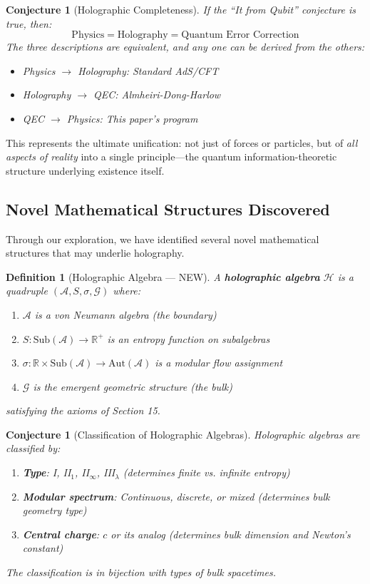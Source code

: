 \documentclass[12pt,a4paper]{article}
\newtheorem{conjecture}[theorem]{Conjecture}
\newtheorem{definition}[theorem]{Definition}
\begin{document}
\begin{conjecture}[Holographic Completeness]
If the ``It from Qubit'' conjecture is true, then:
\begin{equation}
\text{Physics} = \text{Holography} = \text{Quantum Error Correction}
\end{equation}
The three descriptions are equivalent, and any one can be derived from the others:
\begin{itemize}
    \item Physics $\to$ Holography: Standard AdS/CFT
    \item Holography $\to$ QEC: Almheiri-Dong-Harlow
    \item QEC $\to$ Physics: This paper's program
\end{itemize}
\end{conjecture}

This represents the ultimate unification: not just of forces or particles, but of \textit{all aspects of reality} into a single principle---the quantum information-theoretic structure underlying existence itself.

\subsection{Novel Mathematical Structures Discovered}

Through our exploration, we have identified several novel mathematical structures that may underlie holography.

\begin{definition}[Holographic Algebra --- NEW]
A \textbf{holographic algebra} $\mathcal{H}$ is a quadruple $(\mathcal{A}, S, \sigma, \mathcal{G})$ where:
\begin{enumerate}
    \item $\mathcal{A}$ is a von Neumann algebra (the boundary)
    \item $S: \text{Sub}(\mathcal{A}) \to \mathbb{R}^+$ is an entropy function on subalgebras
    \item $\sigma: \mathbb{R} \times \text{Sub}(\mathcal{A}) \to \text{Aut}(\mathcal{A})$ is a modular flow assignment
    \item $\mathcal{G}$ is the emergent geometric structure (the bulk)
\end{enumerate}
satisfying the axioms of Section 15.
\end{definition}

\begin{conjecture}[Classification of Holographic Algebras]
Holographic algebras are classified by:
\begin{enumerate}
    \item \textbf{Type}: I, II$_1$, II$_\infty$, III$_\lambda$ (determines finite vs. infinite entropy)
    \item \textbf{Modular spectrum}: Continuous, discrete, or mixed (determines bulk geometry type)
    \item \textbf{Central charge}: $c$ or its analog (determines bulk dimension and Newton's constant)
\end{enumerate}
The classification is in bijection with types of bulk spacetimes.
\end{conjecture}
\end{document}
